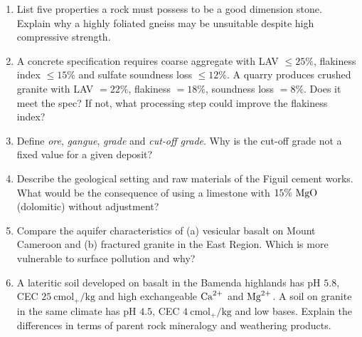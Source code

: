 \documentclass[11pt]{article}
\begin{document}
\begin{exercice}
\begin{enumerate}
    \item List five properties a rock must possess to be a good dimension stone. Explain why a highly foliated gneiss may be unsuitable despite high compressive strength.
    \item A concrete specification requires coarse aggregate with LAV $\le 25\%$, flakiness index $\le 15\%$ and sulfate soundness loss $\le 12\%$. A quarry produces crushed granite with LAV $= 22\%$, flakiness $= 18\%$, soundness loss $= 8\%$. Does it meet the spec? If not, what processing step could improve the flakiness index?
    \item Define \emph{ore}, \emph{gangue}, \emph{grade} and \emph{cut-off grade}. Why is the cut-off grade not a fixed value for a given deposit?
    \item Describe the geological setting and raw materials of the Figuil cement works. What would be the consequence of using a limestone with $15\%\ \ce{MgO}$ (dolomitic) without adjustment?
    \item Compare the aquifer characteristics of (a) vesicular basalt on Mount Cameroon and (b) fractured granite in the East Region. Which is more vulnerable to surface pollution and why?
    \item A lateritic soil developed on basalt in the Bamenda highlands has pH $5.8$, CEC $25\ \mathrm{cmol_+/kg}$ and high exchangeable $\ce{Ca^{2+}}$ and $\ce{Mg^{2+}}$. A soil on granite in the same climate has pH $4.5$, CEC $4\ \mathrm{cmol_+/kg}$ and low bases. Explain the differences in terms of parent rock mineralogy and weathering products.
\end{enumerate}
\end{exercice}
\end{document}

